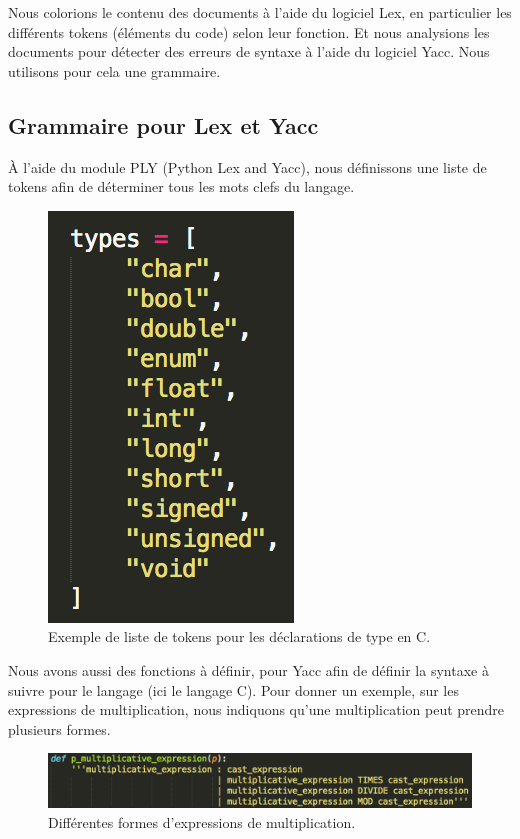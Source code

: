 \documentclass[a4paper,12pt]{article}
\begin{document}
	Nous colorions le contenu des documents à l'aide du logiciel Lex, en particulier les différents tokens (éléments du code) selon leur fonction. Et nous analysions les documents pour détecter des erreurs de syntaxe à l'aide du logiciel Yacc. Nous utilisons pour cela une grammaire.
	
	\subsection{Grammaire pour Lex et Yacc}
	
		À l'aide du module PLY (Python Lex and Yacc), nous définissons une liste de tokens afin de déterminer tous les mots clefs du langage.
		
		\begin{figure}[!h]
			\begin{center}
				\includegraphics[scale=0.6]{images/tokens}
				\caption{Exemple de liste de tokens pour les déclarations de type en C.}
			\end{center}
		\end{figure}
		
		\newpage
		
		Nous avons aussi des fonctions à définir, pour Yacc afin de définir la syntaxe à suivre pour le langage (ici le langage C).
		Pour donner un exemple, sur les expressions de multiplication, nous indiquons qu'une multiplication peut prendre plusieurs formes.
		
		\begin{figure}[!h]
			\begin{center}
				\includegraphics[scale=0.7]{images/yacc1}
				\caption{Différentes formes d'expressions de multiplication.}
			\end{center}
		\end{figure}
		
\end{document}
